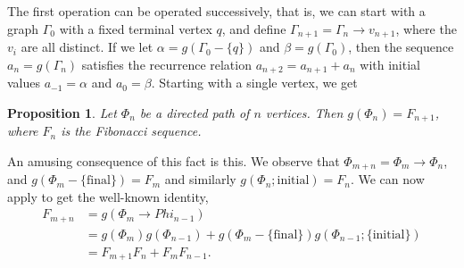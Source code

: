 \documentclass[draft]{article}
\newcommand{\fibo}[1]{F_{#1}}
\theoremstyle{plain}
\newtheorem{prop}{Proposition}[section]
\theoremstyle{definition}
\begin{document}
The first operation can be operated successively, that is, we can start with a graph $\Gamma_0$ with a fixed terminal vertex $q$, and define $\Gamma_{n + 1} = \Gamma_{n} \rightarrow v_{n + 1}$, where the $v_i$ are all distinct. If we let $\alpha = g(\Gamma_0 - \{q\})$ and $\beta = g(\Gamma_0)$, then the sequence $a_n = g(\Gamma_n)$ satisfies the recurrence relation $a_{n + 2} = a_{n + 1} + a_n$ with initial values $a_{-1} = \alpha$ and $a_0 = \beta$. Starting with a single vertex, we get

\begin{prop}
	Let $\Phi_n$ be a directed path of $n$ vertices. Then $g(\Phi_n) = \fibo{n + 1}$, where $\fibo{n}$ is the Fibonacci sequence.
\end{prop}

An amusing consequence of this fact is this. We observe that $\Phi_{m + n} = \Phi_m \rightarrow \Phi_n$, and $g(\Phi_m - \{\text{final}\}) = \fibo{m}$ and similarly $g(\Phi_n; \text{initial}) = \fibo{n}$.
We can now apply  to get the well-known identity, \eqnspace
\begin{align*}
	\fibo{m + n} &= g(\Phi_m \rightarrow Phi_{n - 1}) \\
	&= g(\Phi_m)g(\Phi_{n - 1}) + g(\Phi_m - \{\text{final}\})g(\Phi_{n - 1}; \{\text{initial}\}) \\
	&= \fibo{m + 1}\fibo{n} + \fibo{m}\fibo{n - 1}.
\end{align*}
\end{document}
